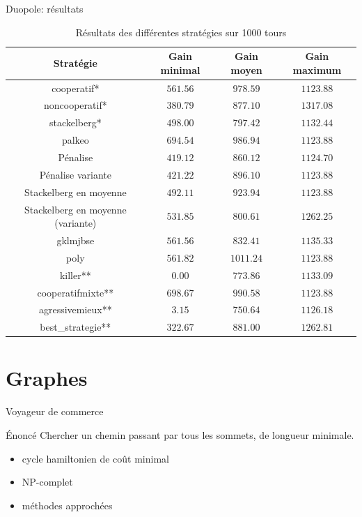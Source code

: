 \documentclass{beamer}
\begin{document}
\begin{frame}{Duopole: résultats}
  \tiny{%
    \begin{table}[f]
      \centering
      \begin{tabular}{|c||c|c|c|}
        \hline
        Stratégie      & Gain minimal & Gain moyen & Gain maximum \\\hline\hline
         cooperatif* & $561.56$ & $978.59$ & $1123.88$ \\\hline
      noncooperatif* & $380.79$ & $877.10$ & $1317.08$ \\\hline
        stackelberg* & $498.00$ & $797.42$ & $1132.44$ \\\hline
              palkeo & $694.54$ & $986.94$ & $1123.88$ \\\hline
            Pénalise & $419.12$ & $860.12$ & $1124.70$ \\\hline
   Pénalise variante & $421.22$ & $896.10$ & $1123.88$ \\\hline
Stackelberg en moyenne & $492.11$ & $923.94$ & $1123.88$ \\\hline
Stackelberg en moyenne (variante) & $531.85$ & $800.61$ & $1262.25$ \\\hline
            gklmjbse & $561.56$ & $832.41$ & $1135.33$ \\\hline
                poly & $561.82$ & $1011.24$ & $1123.88$ \\\hline
            killer** & $  0.00$ & $773.86$ & $1133.09$ \\\hline
   cooperatifmixte** & $698.67$ & $990.58$ & $1123.88$ \\\hline
    agressivemieux** & $  3.15$ & $750.64$ & $1126.18$ \\\hline
   best\_strategie** & $322.67$ & $881.00$ & $1262.81$ \\\hline
      \end{tabular}
      \caption{Résultats des différentes stratégies sur 1000 tours}
      \label{table:coop_results2}
    \end{table}
  }
\end{frame}

\section{Graphes}

\begin{frame}{Voyageur de commerce}
\end{frame}

\begin{frame}{Énoncé}
    Chercher un chemin passant par tous les sommets, de longueur minimale.
    \begin{itemize}
        \item cycle hamiltonien de coût minimal
        \item NP-complet
        \item méthodes approchées
    \end{itemize}
\end{frame}
\end{document}
